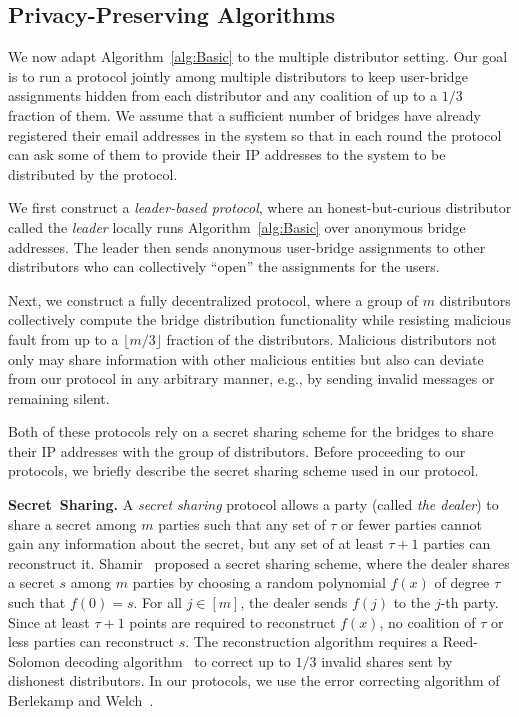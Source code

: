 \documentclass[letterpaper,twocolumn,10pt]{article}
\newcommand{\eg}{e.g.}
\newcommand{\sfsize}{\fontsize{0.68\baselineskip}{0.68\baselineskip}\selectfont}
\newcommand{\sans}[1]{\textbf{\textsf{\sfsize \mbox{#1}}}}
\newcommand{\para}[1]{\vspace{0.55em} \noindent \sans{{\mbox{#1}}}}
\begin{document}
\subsection{Privacy-Preserving Algorithms} \label{sec:multi-dist}
We now adapt Algorithm~\ref{alg:Basic} to the multiple distributor setting. Our goal is to run a protocol jointly among multiple distributors to keep user-bridge assignments hidden from each distributor and any coalition of up to a $1/3$ 	fraction of them. We assume that a sufficient number of bridges have already registered their email addresses in the system so that in each round the protocol can ask some of them to provide their IP addresses to the system to be distributed by the protocol.

We first construct a \emph{leader-based protocol}, where an honest-but-curious distributor called the \emph{leader} locally runs Algorithm~\ref{alg:Basic} over anonymous bridge addresses. The leader then sends anonymous user-bridge assignments to other distributors who can collectively ``open'' the assignments for the users. 

Next, we construct a fully decentralized protocol, where a group of $m$ distributors collectively compute the bridge distribution functionality while resisting malicious fault from up to a $\lfloor m/3 \rfloor$ fraction of the distributors. Malicious distributors not only may share information with other malicious entities but also can deviate from our protocol in any arbitrary manner, \eg, by sending invalid messages or remaining silent.

Both of these protocols rely on a secret sharing scheme for the bridges to share their IP addresses with the group of distributors. Before proceeding to our protocols, we briefly describe the secret sharing scheme used in our protocol.

\para{Secret Sharing.} A \emph{secret sharing} protocol allows a party (called \emph{the dealer}) to share a secret among $m$ parties such that any set of $\tau$ or fewer parties cannot gain any information about the secret, but any set of at least $\tau+1$ parties can reconstruct it. Shamir~\cite{shamir:how} proposed a secret sharing scheme, where the dealer shares a secret $s$ among $m$ parties by choosing a random polynomial $f(x)$ of degree $\tau$ such that ${f(0)=s}$. For all ${j \in [m]}$, the dealer sends $f(j)$ to the $j$-th party. Since at least ${\tau+1}$ points are required to reconstruct $f(x)$, no coalition of $\tau$ or less parties can reconstruct $s$.
The reconstruction algorithm requires a Reed-Solomon decoding algorithm~\cite{Reed-Solomon1960} to correct up to $1/3$ invalid shares sent by dishonest distributors. In our protocols, we use the error correcting algorithm of Berlekamp and Welch~\cite{Berlekamp:Welch:1986}.
\end{document}

